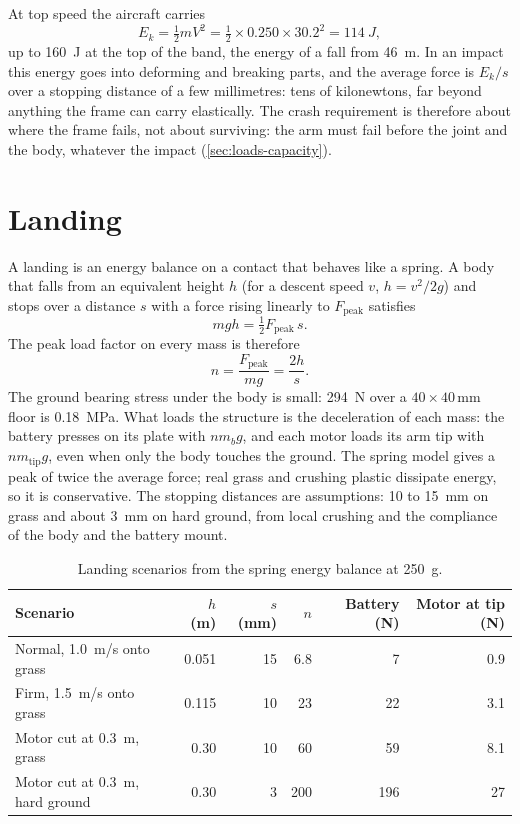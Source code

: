 At top speed the aircraft carries
\begin{equation}
E_k = \tfrac12 m V^2 = \tfrac12 \times 0.250 \times 30.2^2 = \SI{114}{J},
\end{equation}
up to \SI{160}{J} at the top of the band, the energy of a fall from \SI{46}{m}. In an impact this energy goes into deforming and breaking parts, and the average force is $E_k/s$ over a stopping distance of a few millimetres: tens of kilonewtons, far beyond anything the frame can carry elastically. The crash requirement is therefore about where the frame fails, not about surviving: the arm must fail before the joint and the body, whatever the impact (\cref{sec:loads-capacity}).

\section{Landing}\label{sec:loads-landing}

A landing is an energy balance on a contact that behaves like a spring. A body that falls from an equivalent height $h$ (for a descent speed $v$, $h = v^2/2g$) and stops over a distance $s$ with a force rising linearly to $F_\text{peak}$ satisfies
\begin{equation}
mgh = \tfrac12 F_\text{peak}\, s.
\end{equation}
The peak load factor on every mass is therefore
\begin{equation}
n = \frac{F_\text{peak}}{mg} = \frac{2h}{s}.
\end{equation}
The ground bearing stress under the body is small: \SI{294}{N} over a $40\times40$\,mm floor is \SI{0.18}{MPa}. What loads the structure is the deceleration of each mass: the battery presses on its plate with $n m_b g$, and each motor loads its arm tip with $n m_\text{tip} g$, even when only the body touches the ground. The spring model gives a peak of twice the average force; real grass and crushing plastic dissipate energy, so it is conservative. The stopping distances are assumptions: 10 to \SI{15}{mm} on grass and about \SI{3}{mm} on hard ground, from local crushing and the compliance of the body and the battery mount.

\begin{table}[htbp]
\centering\small
\caption{Landing scenarios from the spring energy balance at \SI{250}{g}.}\label{tab:loads-landing}
\begin{tabular}{@{}lrrrrr@{}}
\toprule
Scenario & $h$ (m) & $s$ (mm) & $n$ & Battery (N) & Motor at tip (N)\\
\midrule
Normal, \SI{1.0}{m/s} onto grass & 0.051 & 15 & 6.8 & 7 & 0.9\\
Firm, \SI{1.5}{m/s} onto grass & 0.115 & 10 & 23 & 22 & 3.1\\
Motor cut at \SI{0.3}{m}, grass & 0.30 & 10 & 60 & 59 & 8.1\\
Motor cut at \SI{0.3}{m}, hard ground & 0.30 & 3 & 200 & 196 & 27\\
\bottomrule
\end{tabular}
\end{table}

